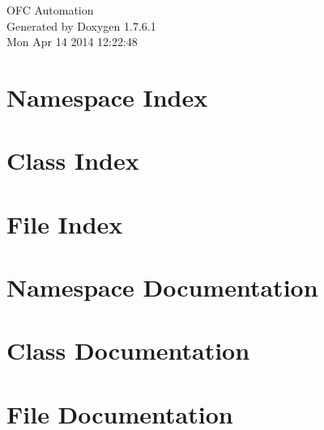\documentclass[a4paper]{book}
\begin{document}
\hypersetup{pageanchor=false,citecolor=blue}
\begin{titlepage}
\vspace*{7cm}
\begin{center}
{\Large \-O\-F\-C \-Automation }\\
\vspace*{1cm}
{\large \-Generated by Doxygen 1.7.6.1}\\
\vspace*{0.5cm}
{\small Mon Apr 14 2014 12:22:48}\\
\end{center}
\end{titlepage}
\clearemptydoublepage
{}
\tableofcontents
\clearemptydoublepage
{}
\hypersetup{pageanchor=true,citecolor=blue}
\chapter{\-Namespace \-Index}

\chapter{\-Class \-Index}

\chapter{\-File \-Index}

\chapter{\-Namespace \-Documentation}







\chapter{\-Class \-Documentation}


















\chapter{\-File \-Documentation}





\printindex
\end{document}

